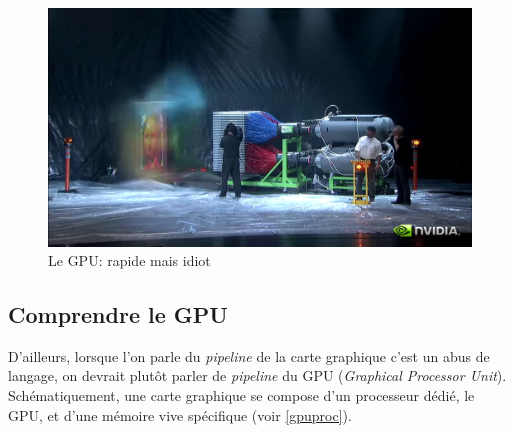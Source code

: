 \begin{figure}[h]
  \hfill
  \begin{minipage}[b]{0.30\linewidth}
    \centering
    \includegraphics[width=\linewidth]{images/pipeline/gpu05.png}
  \end{minipage}
  \caption{Le GPU: rapide mais idiot}
  \label{gpuill}
\end{figure}


\subsection*{Comprendre le GPU}

D'ailleurs, lorsque l'on parle du \textit{pipeline} de la carte graphique c'est un abus de langage, on devrait plutôt parler de \textit{pipeline} du GPU (\textit{Graphical Processor Unit}). Schématiquement, une carte graphique se compose d'un processeur dédié, le GPU, et d'une mémoire vive spécifique (voir \ref{gpuproc}).

